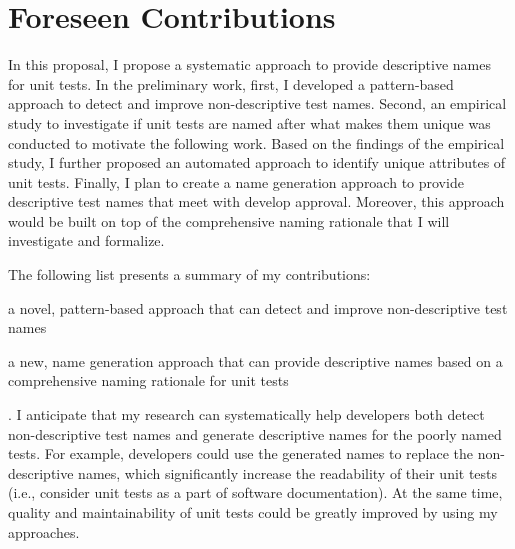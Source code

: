 \section{Foreseen Contributions}
\label{sec:contributions}

In this proposal, I propose a systematic approach to provide descriptive names for unit tests.
%
In the preliminary work, first, I developed a pattern-based approach to detect and improve non-descriptive test names.
%
Second, an empirical study to investigate if unit tests are named after what makes them unique was conducted to motivate the following work.
%
Based on the findings of the empirical study, I further proposed an automated approach to identify unique attributes of unit tests.
%
Finally, I plan to create a name generation approach to provide descriptive test names that meet with develop approval.
%
Moreover, this approach would be built on top of the comprehensive naming rationale that I will investigate and formalize.


The following list presents a summary of my contributions:
\begin{enumerate*}
    \item a novel, pattern-based approach that can detect and improve non-descriptive test names
    \item a new, name generation approach that can provide descriptive names based on a comprehensive naming rationale for unit tests
\end{enumerate*}.
%
I anticipate that my research can systematically help developers both detect non-descriptive test names and generate descriptive names for the poorly named tests.
%
For example, developers could use the generated names to replace the non-descriptive names, which significantly increase the readability of their unit tests (i.e., consider unit tests as a part of software documentation).
%
At the same time, quality and maintainability of unit tests could be greatly improved by using my approaches.